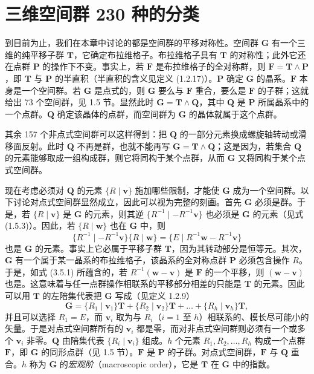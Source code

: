 \section{三维空间群 230 种的分类}

到目前为止，我们在本章中讨论的都是空间群的平移对称性。空间群 $\mathbf{G}$ 有一个三维的纯平移子群 $\mathbf{T}$，它确定布拉维格子。布拉维格子具有 $\mathbf{T}$ 的对称性；此外它还在点群 $\mathbf{P}$ 的操作下不变。事实上，若 $\mathbf{F}$ 是布拉维格子的全对称群，则 $\mathbf{F} = \mathbf{T} \wedge \mathbf{P}$，即 $\mathbf{T}$ 与 $\mathbf{P}$ 的半直积（半直积的含义见定义 (1.2.17)）。$\mathbf{P}$ 确定 $\mathbf{G}$ 的晶系。$\mathbf{F}$ 本身是一个空间群。若 $\mathbf{G}$ 是点式的，则 $\mathbf{G}$ 要么与 $\mathbf{F}$ 重合，要么是 $\mathbf{F}$ 的子群；这就给出 73 个空间群，见 1.5 节。显然此时 $\mathbf{G} = \mathbf{T} \wedge \mathbf{Q}$，其中 $\mathbf{Q}$ 是 $\mathbf{P}$ 所属晶系中的一个点群。$\mathbf{Q}$ 确定该晶体的点群，而空间群为 $\mathbf{G}$ 的晶体就属于这个点群。

其余 157 个非点式空间群可以这样得到：把 $\mathbf{Q}$ 的一部分元素换成螺旋轴转动或滑移面反射。此时 $\mathbf{Q}$ 不再是群，也就不能再写 $\mathbf{G} = \mathbf{T} \wedge \mathbf{Q}$；这是因为，若集合 $\mathbf{Q}$ 的元素能够取成一组构成群，则它将同构于某个点群，从而 $\mathbf{G}$ 又将同构于某个点式空间群。

现在考虑必须对 $\mathbf{Q}$ 的元素 $\{R \mid \mathbf{v}\}$ 施加哪些限制，才能使 $\mathbf{G}$ 成为一个空间群。以下讨论对点式空间群显然成立，因此可以视为完整的刻画。首先 $\mathbf{G}$ 必须是群。于是，若 $\{R \mid \mathbf{v}\}$ 是 $\mathbf{G}$ 的元素，则其逆 $\{R^{-1} \mid -R^{-1}\mathbf{v}\}$ 也必须是 $\mathbf{G}$ 的元素（见式 (1.5.3)）。因此，若 $\{R \mid \mathbf{w}\}$ 也在 $\mathbf{G}$ 中，则
\begin{equation*}
\{R^{-1} \mid -R^{-1}\mathbf{v}\}\{R \mid \mathbf{w}\} = \{E \mid R^{-1}\mathbf{w} - R^{-1}\mathbf{v}\}
\tag{3.5.1}
\end{equation*}
也是 $\mathbf{G}$ 的元素。事实上它必属于平移子群 $\mathbf{T}$，因为其转动部分是恒等元。其次，$\mathbf{G}$ 有一个属于某一晶系的布拉维格子，该晶系的全对称点群 $\mathbf{P}$ 必须包含操作 $R$。于是，如式 (3.5.1) 所蕴含的，若 $R^{-1}(\mathbf{w} - \mathbf{v})$ 是 $\mathbf{F}$ 的一个平移，则 $(\mathbf{w} - \mathbf{v})$ 也是。这意味着与任一点群操作相联系的平移部分相差的只能是 $\mathbf{T}$ 的元素。因此可以用 $\mathbf{T}$ 的左陪集代表把 $\mathbf{G}$ 写成（见定义 1.2.9）
\begin{equation*}
\mathbf{G} = \{R_{1} \mid \mathbf{v}_{1}\}\mathbf{T} + \{R_{2} \mid \mathbf{v}_{2}\}\mathbf{T} + \dots + \{R_{h} \mid \mathbf{v}_{h}\}\mathbf{T},
\tag{3.5.2}
\end{equation*}
并且可以选择 $R_{1} = E$，而 $\mathbf{v}_{i}$ 取为与 $R_{i}$（$i = 1$ 至 $h$）相联系的、模长尽可能小的矢量。于是对点式空间群所有的 $\mathbf{v}_{i}$ 都是零，而对非点式空间群则必须有一个或多个 $\mathbf{v}_{i}$ 非零。$\mathbf{Q}$ 由陪集代表 $\{R_{i} \mid \mathbf{v}_{i}\}$ 组成。$h$ 个元素 $R_{1}, R_{2}, \dots, R_{h}$ 构成一个点群 $\mathbf{F}$，即 $\mathbf{G}$ 的同形点群（见 1.5 节）。$\mathbf{F}$ 是 $\mathbf{P}$ 的子群。对点式空间群，$\mathbf{F}$ 与 $\mathbf{Q}$ 重合。$h$ 称为 $\mathbf{G}$ 的\textit{宏观阶}（macroscopic order），它是 $\mathbf{T}$ 在 $\mathbf{G}$ 中的指数。

